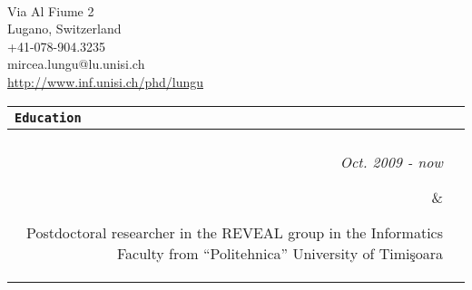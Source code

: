 \documentclass{article}
\newcommand{\cvsectionname}[1]{\multicolumn{2}{l}{\Large \tt #1}\\\hline\\}
\newenvironment{cvsection}[1]{\medskip \begin{tabular}{rl} \cvsectionname{#1}}{\end{tabular}}
\newcommand{\cvline}[2]{\parbox[t]{2.3cm}{\sl  \hfill #1} & \parbox[t]{14cm}{ #2 \hfill}\\\vspace{4pt}}
\newcommand{\cvexplanationline}[1]{ & $\triangleright$ #1 \hfill \\\vspace{4pt}}
\begin{document}
\pagestyle{empty}

\begin{center}
\hspace*{4.8cm}{\LARGE  \bf     Mircea Filip LUNGU}  \\[9pt]
\hspace*{4.8cm}Via Al Fiume 2  \\
\hspace*{4.8cm}Lugano, Switzerland  \\
\hspace*{4.8cm}+41-078-904.3235  \\
\hspace*{4.8cm}mircea.lungu@lu.unisi.ch  \\
\hspace*{4.8cm}\href{http://www.inf.unisi.ch/phd/lungu}{http://www.inf.unisi.ch/phd/lungu}
\end{center}

\vspace{0.3cm}

\begin{cvsection}{Education}
\cvline{Oct. 2009 - now} {Postdoctoral researcher in the REVEAL group in the Informatics Faculty from ``Politehnica'' University of Timi\c{s}oara}
\cvline{Oct. 2004 - Oct 2009} {PhD student at the Faculty of Informatics from the University of Lugano. 
}

\cvline{1999 - 2004} {Student at the Computer Science Faculty from ``Politehnica'' University of Timi\c{s}oara}

\end{cvsection}
\end{document}
